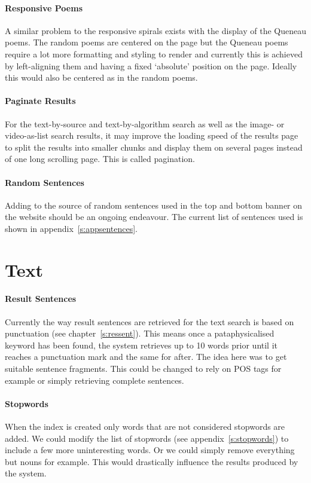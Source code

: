 \paragraph{Responsive Poems} 
A similar problem to the responsive spirals exists with the display of the Queneau poems. The random poems are centered on the page but the Queneau poems require a lot more formatting and styling to render and currently this is achieved by left-aligning them and having a fixed `absolute' position on the page. Ideally this would also be centered as in the random poems. 

\paragraph{Paginate Results}
For the text-by-source and text-by-algorithm search as well as the image- or video-as-list search results, it may improve the loading speed of the results page to split the results into smaller chunks and display them on several pages instead of one long scrolling page. This is called pagination.

\paragraph{Random Sentences} 
Adding to the source of random sentences used in the top and bottom banner on the website should be an ongoing endeavour. The current list of sentences used is shown in appendix~\ref{s:appsentences}.


\section{Text}
\label{s:textfuture}

\paragraph{Result Sentences} 
Currently the way result sentences are retrieved for the text search is based on punctuation (see chapter~\ref{s:ressent}). This means once a pataphysicalised keyword has been found, the system retrieves up to \num{10} words prior until it reaches a punctuation mark and the same for after. The idea here was to get suitable sentence fragments. This could be changed to rely on \ac{POS} tags for example or simply retrieving complete sentences.

\paragraph{Stopwords}
When the index is created only words that are not considered stopwords are added. We could modify the list of stopwords (see appendix~\ref{s:stopwords}) to include a few more uninteresting words. Or we could simply remove everything but nouns for example. This would drastically influence the results produced by the system.

